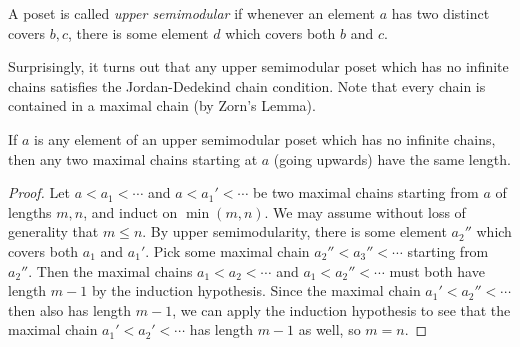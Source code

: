\documentclass[letterpaper,11pt]{article}
\begin{document}
\begin{defn} A poset is called \emph{upper semimodular} if whenever an element $a$ has two distinct covers $b,c$, there is some element $d$ which covers both $b$ and $c$.
\end{defn}

Surprisingly, it turns out that any upper semimodular poset which has no infinite chains satisfies the Jordan-Dedekind chain condition. Note that every chain is contained in a maximal chain (by Zorn's Lemma).%




\begin{prop} If $a$ is any element of an upper semimodular poset which has no infinite chains, then any two maximal chains starting at $a$ (going upwards) have the same length.
\end{prop}
\begin{proof} Let $a < a_1 < \cdots$ and $a < a_1' < \cdots$ be two maximal chains starting from $a$ of lengths $m, n$, and induct on $\min(m,n)$. We may assume without loss of generality that $m \le n$. By upper semimodularity, there is some element $a_2''$ which covers both $a_1$ and $a_1'$. Pick some maximal chain $a_2'' < a_3'' < \cdots$ starting from $a_2''$. Then the maximal chains $a_1 < a_2 < \cdots$ and $a_1 < a_2'' < \cdots$ must both have length $m-1$ by the induction hypothesis. Since the maximal chain $a_1' < a_2'' < \cdots$ then also has length $m-1$, we can apply the induction hypothesis to see that the maximal chain $a_1' < a_2' < \cdots$ has length $m-1$ as well, so $m = n$.
\end{proof}
\end{document}
